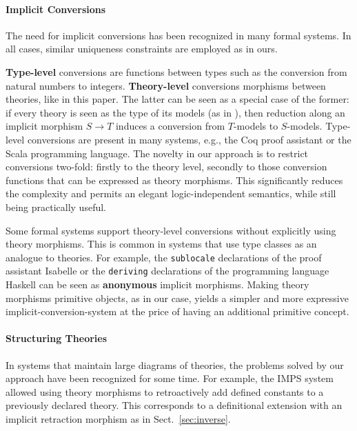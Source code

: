 \paragraph{Implicit Conversions}
The need for implicit conversions has been recognized in many formal systems.
In all cases, similar uniqueness constraints are employed as in ours.

\textbf{Type-level} conversions are functions between types such as the conversion from natural numbers to integers.
\textbf{Theory-level} conversions morphisms between theories, like in this paper.
The latter can be seen as a special case of the former: if every theory is seen as the type of its models (as in \cite{MRK:modelsof:18}), then reduction along an implicit morphism $S\to T$ induces a conversion from $T$-models to $S$-models.
Type-level conversions are present in many systems, e.g., the Coq proof assistant \cite{coq} or the Scala programming language.
The novelty in our approach is to restrict conversions two-fold: firstly to the theory level, secondly to those conversion functions that can be expressed as theory morphisms.
This significantly reduces the complexity and permits an elegant logic-independent semantics, while still being practically useful.

Some formal systems support theory-level conversions without explicitly using theory morphisms.
This is common in systems that use type classes as an analogue to theories.
For example, the \texttt{sublocale} declarations of the proof assistant Isabelle \cite{isabelle_locales} or the \texttt{deriving} declarations of the programming language Haskell can be seen as \textbf{anonymous} implicit morphisms.
Making theory morphisms primitive objects, as in our case, yields a simpler and more expressive implicit-conversion-system at the price of having an additional primitive concept.

\paragraph{Structuring Theories}
In systems that maintain large diagrams of theories, the problems solved by our approach have been recognized for some time.
For example, the IMPS system \cite{imps} allowed using theory morphisms to retroactively add defined constants to a previously declared theory.
This corresponds to a definitional extension with an implicit retraction morphism as in Sect.~\ref{sec:inverse}.

